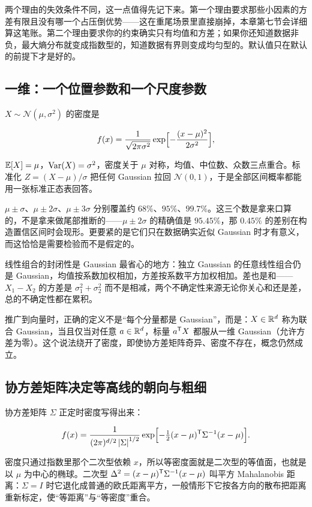 两个理由的失效条件不同，这一点值得先记下来。第一个理由要求那些小因素的方差有限且没有哪一个占压倒优势——这在重尾场景里直接崩掉，本章第七节会详细算这笔账。第二个理由要求你的约束确实只有均值和方差；如果你还知道数据非负，最大熵分布就变成指数型的，知道数据有界则变成均匀型的。默认值只在默认的前提下才是好的。

\subsection{一维：一个位置参数和一个尺度参数}

\(X\sim\mathcal N(\mu,\sigma^2)\) 的密度是

\[
f(x)=\frac{1}{\sqrt{2\pi\sigma^2}}\exp\Bigl[-\frac{(x-\mu)^2}{2\sigma^2}\Bigr],
\]

\(\mathbb{E}[X]=\mu\)，\(\operatorname{Var}(X)=\sigma^2\)，密度关于 \(\mu\) 对称，均值、中位数、众数三点重合。标准化 \(Z=(X-\mu)/\sigma\) 把任何 Gaussian 拉回 \(\mathcal N(0,1)\)，于是全部区间概率都能用一张标准正态表回答。

\(\mu\pm\sigma\)、\(\mu\pm2\sigma\)、\(\mu\pm3\sigma\) 分别覆盖约 \(68\%\)、\(95\%\)、\(99.7\%\)。这三个数是拿来口算的，不是拿来做尾部推断的——\(\mu\pm2\sigma\) 的精确值是 \(95.45\%\)，那 \(0.45\%\) 的差别在构造置信区间时会现形。更要紧的是它们只在数据确实近似 Gaussian 时才有意义，而这恰恰是需要检验而不是假定的。

线性组合的封闭性是 Gaussian 最省心的地方：独立 Gaussian 的任意线性组合仍是 Gaussian，均值按系数加权相加，方差按系数平方加权相加。差也是和——\(X_1-X_2\) 的方差是 \(\sigma_1^2+\sigma_2^2\) 而不是相减，两个不确定性来源无论你关心和还是差，总的不确定性都在累积。

推广到向量时，正确的定义不是``每个分量都是 Gaussian''，而是：\(X\in\mathbb{R}^d\) 称为联合 Gaussian，当且仅当对任意 \(a\in\mathbb{R}^d\)，标量 \(a^{\mathsf{T}}X\) 都服从一维 Gaussian（允许方差为零）。这个说法绕开了密度，即使协方差矩阵奇异、密度不存在，概念仍然成立。

\subsection{协方差矩阵决定等高线的朝向与粗细}

协方差矩阵 \(\Sigma\) 正定时密度写得出来：

\[
f(x)=\frac{1}{(2\pi)^{d/2}\left|\Sigma\right|^{1/2}}
\exp\Bigl[-\tfrac12(x-\mu)^{\mathsf{T}}\Sigma^{-1}(x-\mu)\Bigr].
\]

密度只通过指数里那个二次型依赖 \(x\)，所以等密度面就是二次型的等值面，也就是以 \(\mu\) 为中心的椭球。二次型 \(\Delta^2=(x-\mu)^{\mathsf{T}}\Sigma^{-1}(x-\mu)\) 叫平方 Mahalanobis 距离：\(\Sigma=I\) 时它退化成普通的欧氏距离平方，一般情形下它按各方向的散布把距离重新标定，使``等距离''与``等密度''重合。


